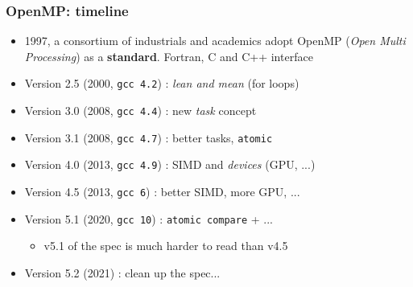 \documentclass{beamer}
\begin{document}
\begin{frame}
  \frametitle{OpenMP: timeline}
  \begin{itemize}
  \item 1997, a consortium of industrials and academics adopt OpenMP ({\it Open
      Multi Processing}) as a \textbf{standard}. Fortran, C and C++
    interface

  \item Version 2.5 (2000, \texttt{gcc 4.2}) : \emph{lean and mean} (for loops)

  \item Version 3.0 (2008, \texttt{gcc 4.4}) : new \emph{task} concept 

  \item Version 3.1 (2008, \texttt{gcc 4.7}) : better tasks, \texttt{atomic}

  \item Version 4.0 (2013, \texttt{gcc 4.9}) : SIMD and \emph{devices} (GPU, ...)
    
  \item Version 4.5 (2013, \texttt{gcc 6}) : better SIMD, more GPU, ...
    
  \item Version 5.1 (2020, \texttt{gcc 10}) : \texttt{atomic compare} + ...
    \begin{itemize}
    \item v5.1 of the spec is much harder to read than v4.5
    \end{itemize}
  \item Version 5.2 (2021) : clean up the spec... 
\end{itemize}
\end{frame}
\end{document}
